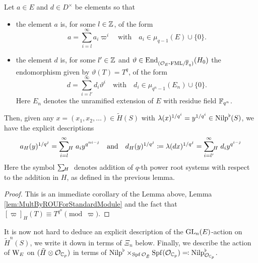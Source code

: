 \documentclass[../main.tex]{subfiles}
\begin{document}
\begin{cor}\label{cor:ExplicitDescriptionOfActionOnUnivCov}
  Let $a \in E$ and $d \in D^\times$ be elements so that
  \begin{itemize}
    \item the element $a$ is, for some $l \in \mathbb{Z}$, of the form
      \begin{equation*}
        a = \sum_{i = l}^\infty a_i \varpi^i \quad \text{with} \quad
        a_i \in \mu_{q-1}(E) \cup \{0\}.
      \end{equation*}
    \item the element $d$ is, for some $l' \in \mathbb{Z}$ and 
      $\vartheta \in \operatorname{End}_{{({\mathcal{O}_E}\text-\allowbreak\mathrm{FML}/{{\overline {\mathbb{F}}_q}})}} (H_0)$ the endomorphism given
      by $\vartheta(T) = T^q$, of the form
      \begin{equation*}
        d = \sum_{i = l'}^\infty d_i \vartheta^i \quad \text{with} \quad
        d_i \in \mu_{q^n-1}(E_n) \cup \{0\}.
      \end{equation*}
      Here $E_n$ denotes the unramified extension of $E$ with residue field 
      $\mathbb{F}_{q^n}$. 
  \end{itemize}
  Then, given any $x = (x_1, x_2, \dots)
  \in \tilde H(S)$ with $\lambda(x)^{1/q^i} = y^{1/q^i} \in {\mathrm{Nilp}}^\flat(S)$, we
  have the explicit descriptions
  \begin{equation*}
    a_H(y)^{1/q^j}  = \sum_{i=l}^\infty{\hspace{-3pt}}_H\hspace{3pt} a_i y^{q^{ni-j}}
  \quad \text{and} \quad
  d_H(y)^{1/q^j} \coloneqq \lambda(dx)^{1/q^j} = \sum_{i=l'}^\infty {\hspace{-3pt}}_H\hspace{3pt} d_i y^{q^{i-j}}
  \end{equation*}
  Here the symbol $\sum {\hspace{-3pt}}_H\hspace{3pt}$ \hspace{-10pt} denotes addition of $q$-th power
  root systems with
  respect to the addition in $H$, as defined in the previous lemma.
  \begin{proof}
    This is an immediate corollary of the Lemma above, Lemma
    \ref{lem:MultByROUForStandardModule} and the fact that 
    $[\varpi]_H(T) \equiv T^{q^n} \pmod \varpi$. 
  \end{proof}
\end{cor}

It is now not hard to deduce an explicit description of the $\operatorname{GL}_n(E)$-action
on $\tilde H^n(S)$, we write it down in terms of $\Xi_n$ below. Finally, we
describe the action of $\mathrm W_E$ on $(\tilde H \otimes \mathcal{O}_{\mathbb{C}_p})$ in terms
of ${\mathrm{Nilp}}^\flat \times_{\operatorname{Spf} \mathcal{O}_{\breve {E}}} \operatorname{Spf}(\mathcal{O}_{\mathbb{C}_p}) \eqcolon {\mathrm{Nilp}}^\flat_{\mathcal{O}_{\mathbb{C}_p}}$.
\end{document}
